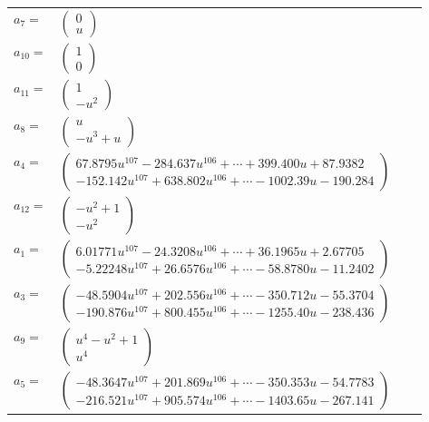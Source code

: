 \documentclass[1p]{elsarticle_modified}
\theoremstyle{definition}
\begin{document}
\begin{tabular}{m{7pt} m{180pt} m{7pt} m{180pt} }
\flushright $a_{7}=$&$\begin{pmatrix}0\\u\end{pmatrix}$ \\
\flushright $a_{10}=$&$\begin{pmatrix}1\\0\end{pmatrix}$ \\
\flushright $a_{11}=$&$\begin{pmatrix}1\\- u^2\end{pmatrix}$ \\
\flushright $a_{8}=$&$\begin{pmatrix}u\\- u^3+u\end{pmatrix}$ \\
\flushright $a_{4}=$&$\begin{pmatrix}67.8795 u^{107}-284.637 u^{106}+\cdots+399.400 u+87.9382\\-152.142 u^{107}+638.802 u^{106}+\cdots-1002.39 u-190.284\end{pmatrix}$ \\
\flushright $a_{12}=$&$\begin{pmatrix}- u^2+1\\- u^2\end{pmatrix}$ \\
\flushright $a_{1}=$&$\begin{pmatrix}6.01771 u^{107}-24.3208 u^{106}+\cdots+36.1965 u+2.67705\\-5.22248 u^{107}+26.6576 u^{106}+\cdots-58.8780 u-11.2402\end{pmatrix}$ \\
\flushright $a_{3}=$&$\begin{pmatrix}-48.5904 u^{107}+202.556 u^{106}+\cdots-350.712 u-55.3704\\-190.876 u^{107}+800.455 u^{106}+\cdots-1255.40 u-238.436\end{pmatrix}$ \\
\flushright $a_{9}=$&$\begin{pmatrix}u^4- u^2+1\\u^4\end{pmatrix}$ \\
\flushright $a_{5}=$&$\begin{pmatrix}-48.3647 u^{107}+201.869 u^{106}+\cdots-350.353 u-54.7783\\-216.521 u^{107}+905.574 u^{106}+\cdots-1403.65 u-267.141\end{pmatrix}$ \\

\end{tabular}
\end{document}
